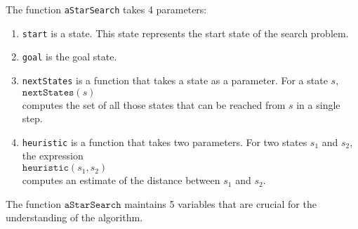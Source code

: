 \noindent
The function \texttt{aStarSearch} takes 4 parameters:
\begin{enumerate}
\item \texttt{start} is a state.  This state represents the start state of the search problem.
\item \texttt{goal} is the goal state.  
\item \texttt{nextStates} is a function that takes a state as a parameter.  For a state $s$,
      \\[0.2cm]
      \hspace*{1.3cm}
      $\mathtt{nextStates}(s)$
      \\[0.2cm]
      computes the set of all those states that can be reached from $s$ in a single step.
\item \texttt{heuristic} is a function that takes two parameters.  
      For two states $s_1$ and $s_2$, the expression
      \\[0.2cm]
      \hspace*{1.3cm}
      $\texttt{heuristic}(s_1, s_2)$ 
      \\[0.2cm]
      computes an estimate of the distance between $s_1$ and $s_2$.
\end{enumerate}
The function $\mathtt{aStarSearch}$ maintains 5 variables that are crucial for the understanding of the
algorithm. 
